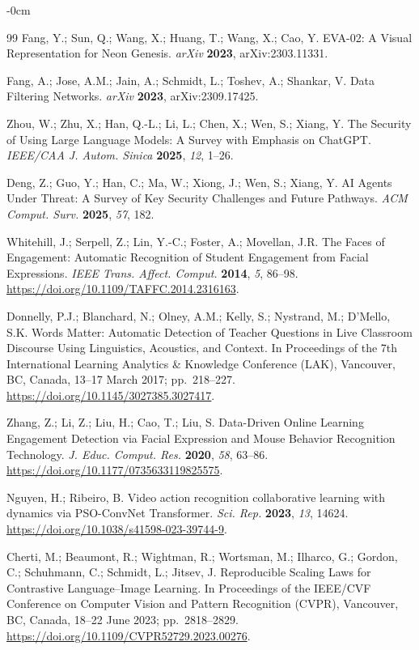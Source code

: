 \documentclass[symmetry,article,submit,pdftex,moreauthors]{Definitions/mdpi}
\begin{document}
\begin{adjustwidth}{-\extralength}{0cm}
\begin{thebibliography}{99}
Fang, Y.; Sun, Q.; Wang, X.; Huang, T.; Wang, X.; Cao, Y.
EVA-02: A Visual Representation for Neon Genesis.
\textit{arXiv} \textbf{2023}, arXiv:2303.11331.

Fang, A.; Jose, A.M.; Jain, A.; Schmidt, L.; Toshev, A.; Shankar, V.
Data Filtering Networks.
\textit{arXiv} \textbf{2023}, arXiv:2309.17425.

Zhou, W.; Zhu, X.; Han, Q.-L.; Li, L.; Chen, X.; Wen, S.; Xiang, Y.
The Security of Using Large Language Models: A Survey with Emphasis on ChatGPT.
\textit{IEEE/CAA J. Autom. Sinica} \textbf{2025}, \textit{12}, 1--26.

Deng, Z.; Guo, Y.; Han, C.; Ma, W.; Xiong, J.; Wen, S.; Xiang, Y.
AI Agents Under Threat: A Survey of Key Security Challenges and Future Pathways.
\textit{ACM Comput. Surv.} \textbf{2025}, \textit{57}, 182.

Whitehill, J.; Serpell, Z.; Lin, Y.-C.; Foster, A.; Movellan, J.R.
The Faces of Engagement: Automatic Recognition of Student Engagement from Facial Expressions.
\textit{IEEE Trans. Affect. Comput.} \textbf{2014}, \textit{5}, 86--98. \url{https://doi.org/10.1109/TAFFC.2014.2316163}.

Donnelly, P.J.; Blanchard, N.; Olney, A.M.; Kelly, S.; Nystrand, M.; D'Mello, S.K.
Words Matter: Automatic Detection of Teacher Questions in Live Classroom Discourse Using Linguistics, Acoustics, and Context.
In Proceedings of the 7th International Learning Analytics \& Knowledge Conference (LAK), Vancouver, BC, Canada, 13--17 March 2017; pp.~218--227. \url{https://doi.org/10.1145/3027385.3027417}.

Zhang, Z.; Li, Z.; Liu, H.; Cao, T.; Liu, S.
Data-Driven Online Learning Engagement Detection via Facial Expression and Mouse Behavior Recognition Technology.
\textit{J. Educ. Comput. Res.} \textbf{2020}, \textit{58}, 63--86. \url{https://doi.org/10.1177/0735633119825575}.

Nguyen, H.; Ribeiro, B.
Video action recognition collaborative learning with dynamics via PSO-ConvNet Transformer.
\textit{Sci. Rep.} \textbf{2023}, \textit{13}, 14624. \url{https://doi.org/10.1038/s41598-023-39744-9}.

Cherti, M.; Beaumont, R.; Wightman, R.; Wortsman, M.; Ilharco, G.; Gordon, C.; Schuhmann, C.; Schmidt, L.; Jitsev, J.
Reproducible Scaling Laws for Contrastive Language--Image Learning.
In Proceedings of the IEEE/CVF Conference on Computer Vision and Pattern Recognition (CVPR), Vancouver, BC, Canada, 18--22 June 2023; pp.~2818--2829. \url{https://doi.org/10.1109/CVPR52729.2023.00276}.


\end{thebibliography}
\end{adjustwidth}
\end{document}
